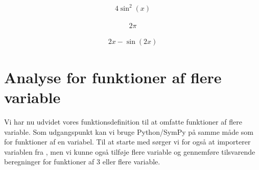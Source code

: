 \documentclass[letterpaper,10pt,english]{jupyterBook}
\begin{document}
\begin{sphinxVerbatim}[commandchars=\\\{\}]
        

\end{sphinxVerbatim}
\begin{equation*}
\begin{split}\displaystyle 4 \sin^{2}{\left(x \right)}\end{split}
\end{equation*}
\begin{sphinxVerbatim}[commandchars=\\\{\}]
          
\end{sphinxVerbatim}
\begin{equation*}
\begin{split}\displaystyle 2 \pi\end{split}
\end{equation*}
\begin{sphinxVerbatim}[commandchars=\\\{\}]
\end{sphinxVerbatim}
\begin{equation*}
\begin{split}\displaystyle 2 x - \sin{\left(2 x \right)}\end{split}
\end{equation*}

\section{Analyse for funktioner af flere variable}
\label{\detokenize{notebooks/sympy/Notebook_FlereVar_analyse:analyse-for-funktioner-af-flere-variable}}\label{\detokenize{notebooks/sympy/Notebook_FlereVar_analyse::doc}}
Vi har nu udvidet vores funktionsdefinition til at omfatte funktioner af flere variable. Som udgangspunkt kan vi bruge Python/SymPy på samme måde som for funktioner af en variabel. Til at starte med sørger vi for også at importerer variablen  fra , men vi kunne også tilføje flere variable og gennemføre tilsvarende beregninger for funktioner af 3 eller flere variable.
\end{document}
